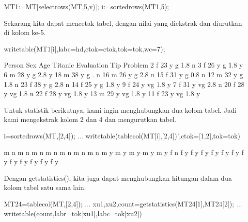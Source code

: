 \documentclass{article}
\begin{document}
\>MT1:=MT[selectrows(MT,5,v)]; i:=sortedrows(MT1,5);


Sekarang kita dapat mencetak tabel, dengan nilai yang diekstrak dan
diurutkan di kolom ke-5.


\>writetable(MT1[i],labc=hd,ctok=ctok,tok=tok,wc=7);


     Person    Sex    Age Titanic Evaluation    Tip Problem
          2      f     23       y          g    1.8       n
          3      f     26       y          g    1.8       y
          6      m     28       y          g    2.8       y
         18      m     38       y          g      .       n
         16      m     26       y          g    2.8       n
         15      f     31       y          g    0.8       n
         12      m     32       y          g    1.8       n
         23      f     38       y          g    2.8       n
         14      f     25       y          g    1.8       y
          9      f     24       y         vg    1.8       y
          7      f     31       y         vg    2.8       n
         20      f     28       y         vg    1.8       n
         22      f     28       y         vg    1.8       y
         13      m     29       y         vg    1.8       y
         11      f     23       y         vg    1.8       y

Untuk statistik berikutnya, kami ingin menghubungkan dua kolom tabel.
Jadi kami mengekstrak kolom 2 dan 4 dan mengurutkan tabel.


\>i=sortedrows(MT,[2,4]);  ...  
\>     writetable(tablecol(MT[i],[2,4])',ctok=[1,2],tok=tok)


             m         n
             m         n
             m         n
             m         n
             m         n
             m         n
             m         n
             m         y
             m         y
             m         y
             m         y
             m         y
             f         n
             f         y
             f         y
             f         y
             f         y
             f         y
             f         y
             f         y
             f         y
             f         y
             f         y
             f         y
             f         y

Dengan getstatistics(), kita juga dapat menghubungkan hitungan dalam
dua kolom tabel satu sama lain.


\>MT24=tablecol(MT,[2,4]); ...  
\>   {xu1,xu2,count}=getstatistics(MT24[1],MT24[2]); ...  
\>   writetable(count,labr=tok[xu1],labc=tok[xu2])
\end{document}
